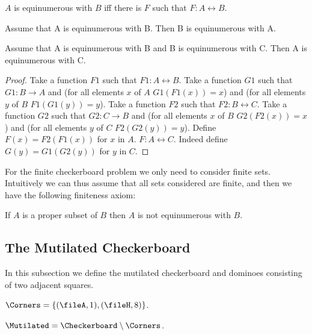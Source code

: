 \begin{forthel}
    \begin{definition}
        $A$ is equinumerous with $B$ iff there is $F$ such that $F : A \leftrightarrow B$.
    \end{definition}

    \begin{lemma}
        Assume that A is equinumerous with B. Then B is equinumerous with A.
    \end{lemma}

    \begin{lemma}
        Assume that A is equinumerous with B and B is equinumerous with C.
        Then A is equinumerous with C.
    \end{lemma}
    \begin{proof}
        Take a function $F1$ such that $F1 : A \leftrightarrow B$.
        Take a function $G1$ such that $G1 : B \to A$ and (for all elements $x$ of $A$ $G1(F1(x))=x$) and
        (for all elements $y$ of $B$ $F1(G1(y))=y$).
        Take a function $F2$ such that $F2 : B \leftrightarrow C$.
        Take a function $G2$ such that $G2 : C \to B$ and (for all elements $x$ of $B$ $G2(F2(x))=x$) and
        (for all elements $y$ of $C$ $F2(G2(y))=y$).
        Define $F(x) = F2(F1(x))$ for $x$ in $A$.
        $F : A \leftrightarrow C$. Indeed define $G(y) = G1(G2(y))$ for $y$ in $C$.
    \end{proof}
\end{forthel}


For the finite checkerboard problem we only need to consider finite sets.
Intuitively we can thus assume that all sets considered are finite, and then
we have the following finiteness axiom:

\begin{forthel}
    \begin{axiom}
        If $A$ is a proper subset of $B$ then $A$ is not equinumerous with $B$.
    \end{axiom}
\end{forthel}


\subsection{The Mutilated Checkerboard}

In this subsection we define the mutilated checkerboard and dominoes consisting
of two adjacent squares.

\begin{forthel}
    \begin{definition}
        $\Corners = \{ (\fileA, 1), (\fileH, 8) \}$.
    \end{definition}

    \begin{definition}
        $\Mutilated = \Checkerboard \setminus \Corners$.
    \end{definition}
\end{forthel}



